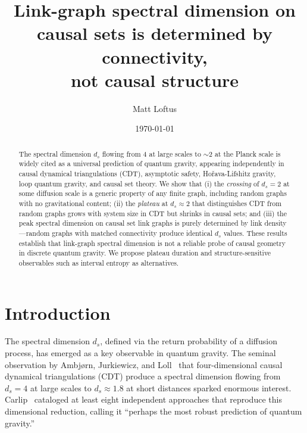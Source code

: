 \documentclass[aps,prd,twocolumn,superscriptaddress,nofootinbib]{revtex4-2}
\begin{document}
\title{Link-graph spectral dimension on causal sets is determined by connectivity,\\not causal structure}

\author{Matt Loftus}

\date{\today}

\begin{abstract}
The spectral dimension $d_s$ flowing from 4 at large scales to $\sim$2 at the Planck scale is widely cited as a universal prediction of quantum gravity, appearing independently in causal dynamical triangulations (CDT), asymptotic safety, Ho\v{r}ava-Lifshitz gravity, loop quantum gravity, and causal set theory. We show that (i) the \emph{crossing} of $d_s = 2$ at some diffusion scale is a generic property of any finite graph, including random graphs with no gravitational content; (ii) the \emph{plateau} at $d_s \approx 2$ that distinguishes CDT from random graphs grows with system size in CDT but shrinks in causal sets; and (iii) the peak spectral dimension on causal set link graphs is purely determined by link density---random graphs with matched connectivity produce identical $d_s$ values. These results establish that link-graph spectral dimension is not a reliable probe of causal geometry in discrete quantum gravity. We propose plateau duration and structure-sensitive observables such as interval entropy as alternatives.
\end{abstract}

\maketitle

\section{Introduction}

The spectral dimension $d_s$, defined via the return probability of a diffusion process, has emerged as a key observable in quantum gravity. The seminal observation by Ambj\o{}rn, Jurkiewicz, and Loll~\cite{ambjorn2005} that four-dimensional causal dynamical triangulations (CDT) produce a spectral dimension flowing from $d_s = 4$ at large scales to $d_s \approx 1.8$ at short distances sparked enormous interest. Carlip~\cite{carlip2017} cataloged at least eight independent approaches that reproduce this dimensional reduction, calling it ``perhaps the most robust prediction of quantum gravity.''
\end{document}
